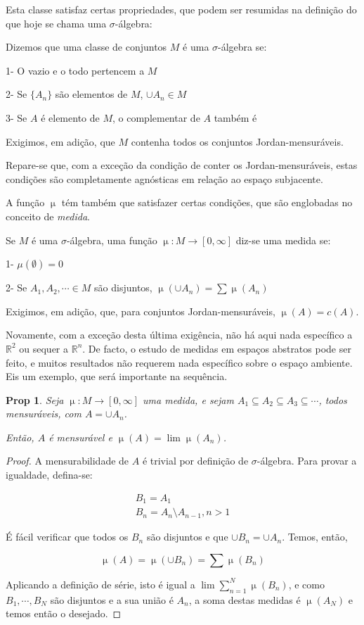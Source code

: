 \documentclass{article}
\newtheorem{prop}{Prop}
\newcommand{\R}{\mathbb{R}}
\DeclareMathOperator{\mmu}{\mu}
\begin{document}
Esta classe satisfaz certas propriedades, que podem ser resumidas na definição do que hoje se chama uma $\sigma$-álgebra:

Dizemos que uma classe de conjuntos $M$ é uma $\sigma$-álgebra se:

1- O vazio e o todo pertencem a $M$

2- Se $\{A_n\}$ são elementos de $M$, $\cup A_n \in M$

3- Se $A$ é elemento de $M$, o complementar de $A$ também é

Exigimos, em adição, que $M$ contenha todos os conjuntos Jordan-mensuráveis.

Repare-se que, com a exceção da condição de conter os Jordan-mensuráveis, estas condições são completamente agnósticas em relação ao espaço subjacente.

A função $\mmu$ tém também que satisfazer certas condições, que são englobadas no conceito de \emph{medida}.

Se $M$ é uma $\sigma$-álgebra, uma função $\mmu : M \to [0, \infty]$ diz-se uma medida se:

1- $\mu(\emptyset) = 0$

2- Se $A_1, A_2, \cdots \in M$ são disjuntos, $\mmu(\cup A_n) = \sum \mmu(A_n)$

Exigimos, em adição, que, para conjuntos Jordan-mensuráveis, $\mmu(A) = c(A)$.

Novamente, com a exceção desta última exigência, não há aqui nada específico a $\R^2$ ou sequer a $\R^n$. De facto, o estudo de medidas em espaços abstratos pode ser feito, e muitos resultados não requerem nada específico sobre o espaço ambiente. Eis um exemplo, que será importante na sequência.

\begin{prop}
Seja $\mmu : M \to [0, \infty]$ uma medida, e sejam $A_1 \subseteq A_2 \subseteq A_3 \subseteq \cdots$, todos mensuráveis, com $A = \cup A_n$.

Então, $A$ é mensurável e $\mmu(A) = \lim \mmu(A_n)$.
\end{prop}

\begin{proof}
A mensurabilidade de $A$ é trivial por definição de $\sigma$-álgebra. Para provar a igualdade, defina-se:

\begin{gather*}
B_1 = A_1\\
B_n = A_n \setminus A_{n-1}, n > 1
\end{gather*}

É fácil verificar que todos os $B_n$ são disjuntos e que $\cup B_n = \cup A_n$. Temos, então,

\[ \mmu(A) = \mmu(\cup B_n) = \sum \mmu(B_n) \]

Aplicando a definição de série, isto é igual a $\lim \sum_{n = 1}^N \mmu(B_n)$, e como $B_1, \cdots, B_N$ são disjuntos e a sua união é $A_n$, a soma destas medidas é $\mmu(A_N)$ e temos então o desejado.
\end{proof}
\end{document}

